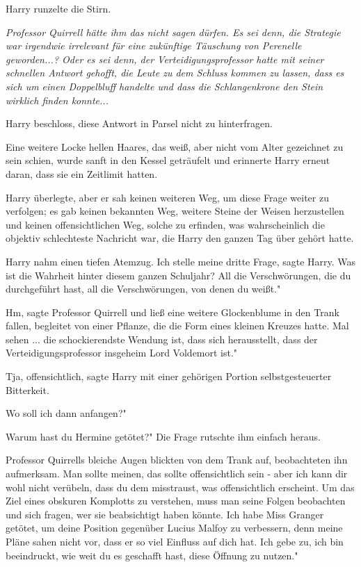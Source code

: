 Harry runzelte die Stirn.

\emph{Professor Quirrell hätte ihm das nicht sagen dürfen. Es sei denn, die Strategie war irgendwie irrelevant für eine zukünftige Täuschung von Perenelle geworden...? Oder es sei denn, der Verteidigungsprofessor hatte mit seiner schnellen Antwort gehofft, die Leute zu dem Schluss kommen zu lassen, dass es sich um einen Doppelbluff handelte und dass die Schlangenkrone den Stein wirklich finden konnte... }

Harry beschloss, diese Antwort in Parsel nicht zu hinterfragen.

Eine weitere Locke hellen Haares, das weiß, aber nicht vom Alter gezeichnet zu
sein schien, wurde sanft in den Kessel geträufelt und erinnerte Harry erneut
daran, dass sie ein Zeitlimit hatten.

Harry überlegte, aber er sah keinen weiteren Weg, um diese Frage weiter zu
verfolgen; es gab keinen bekannten Weg, weitere Steine der Weisen herzustellen
und keinen offensichtlichen Weg, solche zu erfinden, was wahrscheinlich die
objektiv schlechteste Nachricht war, die Harry den ganzen Tag über gehört hatte.

Harry nahm einen tiefen Atemzug. \glqq Ich stelle meine dritte Frage\grqq{},
sagte Harry. \glqq Was ist die Wahrheit hinter diesem ganzen Schuljahr? All die
Verschwörungen, die du durchgeführt hast, all die Verschwörungen, von denen du
weißt."

\glqq Hm\grqq{}, sagte Professor Quirrell und ließ eine weitere Glockenblume in
den Trank fallen, begleitet von einer Pflanze, die die Form eines kleinen
Kreuzes hatte. \glqq Mal sehen ... die schockierendste Wendung ist, dass sich
herausstellt, dass der Verteidigungsprofessor insgeheim Lord Voldemort ist."

\glqq Tja, offensichtlich\grqq{}, sagte Harry mit einer gehörigen Portion
selbstgesteuerter Bitterkeit.

\glqq Wo soll ich dann anfangen?"

\glqq Warum hast du Hermine getötet?" Die Frage rutschte ihm einfach heraus.

Professor Quirrells bleiche Augen blickten von dem Trank auf, beobachteten ihn
aufmerksam. \glqq Man sollte meinen, das sollte offensichtlich sein - aber ich
kann dir wohl nicht verübeln, dass du dem misstraust, was offensichtlich
erscheint. Um das Ziel eines obskuren Komplotts zu verstehen, muss man seine
Folgen beobachten und sich fragen, wer sie beabsichtigt haben könnte. Ich habe
Miss Granger getötet, um deine Position gegenüber Lucius Malfoy zu verbessern,
denn meine Pläne sahen nicht vor, dass er so viel Einfluss auf dich hat. Ich
gebe zu, ich bin beeindruckt, wie weit du es geschafft hast, diese Öffnung zu
nutzen."


